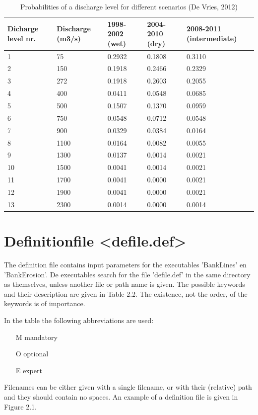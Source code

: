 \begin{table}
\begin{tabular}{p{2cm}p{2cm}p{2cm}p{2cm}p{2cm}}
Dicharge level nr. & Discharge (m3/s) & 1998-2002 (wet) & 2004-2010 (dry) & 2008-2011 (intermediate) \\ \hline
1 & 75 & 0.2932 & 0.1808 & 0.3110 \\
2 & 150 & 0.1918 & 0.2466 & 0.2329 \\
3 & 272 & 0.1918 & 0.2603 & 0.2055 \\
4 & 400 & 0.0411 & 0.0548 & 0.0685 \\
5 & 500 & 0.1507 & 0.1370 & 0.0959 \\
6 & 750 & 0.0548 & 0.0712 & 0.0548 \\
7 & 900 & 0.0329 & 0.0384 & 0.0164 \\
8 & 1100 & 0.0164 & 0.0082 & 0.0055 \\
9 & 1300 & 0.0137 & 0.0014 & 0.0021 \\
10 & 1500 & 0.0041 & 0.0014 & 0.0021 \\
11 & 1700 & 0.0041 & 0.0000 & 0.0021 \\
12 & 1900 & 0.0041 & 0.0000 & 0.0021 \\
13 & 2300 & 0.0014 & 0.0000 & 0.0014 \\ \hline
\end{tabular}
\caption{Probabilities of a discharge level for different scenarios (De Vries, 2012)}
\label{Tab2.1}
\end{table}

\section{Definitionfile <defile.def>}

The definition file contains input parameters for the executables 'BankLines' en 'BankErosion'.
De executables search for the file 'defile.def' in the same directory as themselves, unless another file or path name is given.
The possible keywords and their description are given in Table 2.2.
The existence, not the order, of the keywords is of importance.

In the table the following abbreviations are used:
\begin{itemize}
\item[M] mandatory
\item[O] optional
\item[E] expert
\end{itemize}

Filenames can be either given with a single filename, or with their (relative) path and they should contain no spaces.
An example of a definition file is given in Figure 2.1.

